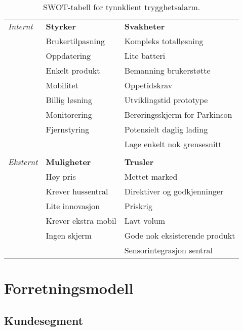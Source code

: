 \begin{table}[h]
  \centering
  \begin{tabular}{lll}
    \textit{Internt}  & \textbf{Styrker}       & \textbf{Svakheter}            \\
             & Brukertilpasning       & Kompleks totalløsning         \\
             & Oppdatering            & Lite batteri                  \\
             & Enkelt produkt         & Bemanning brukerstøtte        \\
             & Mobilitet              & Oppetidskrav                  \\
             & Billig løsning         & Utviklingstid prototype       \\
             & Monitorering           & Berøringsskjerm for Parkinson \\
             & Fjernstyring           & Potensielt daglig lading      \\
             &                        & Lage enkelt nok grensesnitt   \\
    \\
    \textit{Eksternt} & \textbf{Muligheter}    & \textbf{Trusler}              \\
             & Høy pris               & Mettet marked                 \\
             & Krever hussentral      & Direktiver og godkjenninger   \\
             & Lite innovasjon        & Priskrig                      \\
             & Krever ekstra mobil    & Lavt volum                    \\
             & Ingen skjerm           & Gode nok eksisterende produkt \\
             &                        & Sensorintegrasjon sentral     \\
  \end{tabular}
  \caption{SWOT-tabell for tynnklient trygghetsalarm.}
  \label{table.swot}
\end{table}

\section{Forretningsmodell}

\subsection{Kundesegment}


